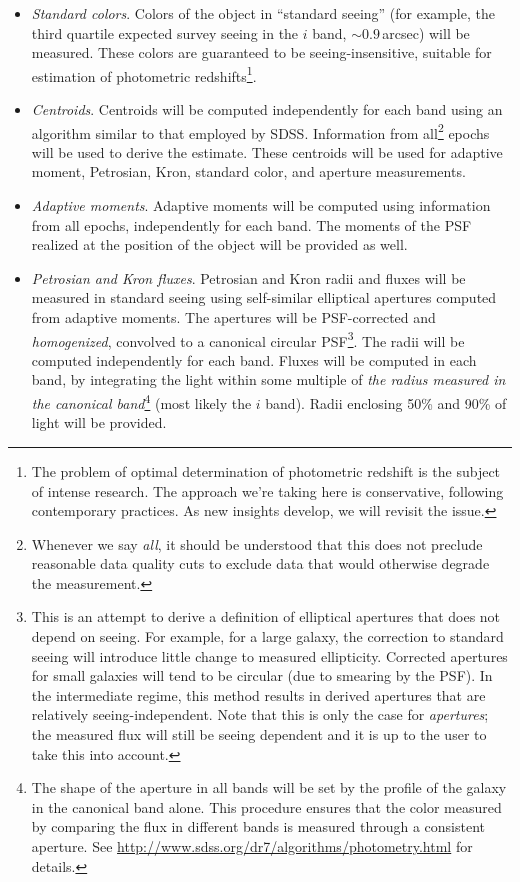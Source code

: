 \documentclass[SE,lsstdraft,toc]{lsstdoc}
\newcommand{\marginreq}[1]{\marginpar{\hspace{0pt}\tiny #1}}
\newcommand{\dmreq}[1]{\marginreq{DMS-REQ-#1}}
\begin{document}
\begin{itemize}
    \item \emph{Standard colors}. \dmreq{0276} Colors of the object in ``standard seeing'' (for example, the third quartile expected survey seeing in the $i$ band, $\sim 0.9$\,arcsec) will be measured. These colors are guaranteed to be seeing-insensitive,  suitable for estimation of photometric redshifts\footnote{The problem of optimal determination of photometric redshift is the subject of intense research. The approach we're taking here is conservative, following contemporary practices. As new insights develop, we will revisit the issue.}.

    \item \emph{Centroids}. Centroids will be computed independently for each band using an algorithm similar to that employed by SDSS. Information from all\footnote{Whenever we say \emph{all}, it should be understood that this does not preclude reasonable data quality cuts to exclude data that would otherwise degrade the measurement.} epochs will be used to derive the estimate. These centroids will be used for adaptive moment, Petrosian, Kron, standard color, and aperture measurements. \dmreq{0276}

    \item \emph{Adaptive moments}. Adaptive moments will be computed using information from all epochs, independently for each band. The moments of the PSF realized at the position of the object will be provided as well. \dmreq{0276}

    \item \emph{Petrosian and Kron fluxes}. Petrosian and Kron radii and fluxes will be measured in standard seeing using self-similar elliptical apertures computed from adaptive moments. The apertures will be PSF-corrected and \emph{homogenized}, convolved to a canonical circular PSF\footnote{This is an attempt to derive a definition of elliptical apertures that does not depend on seeing. For example, for a large galaxy, the correction to standard seeing will introduce little change to measured ellipticity. Corrected apertures for small galaxies will tend to be circular (due to smearing by the PSF). In the intermediate regime, this method results in derived apertures that are relatively seeing-independent. Note that this is only the case for \emph{apertures}; the measured flux will still be seeing dependent and it is up to the user to take this into account.}. The radii will be computed independently for each band. Fluxes will be computed in each band, by integrating the light within some multiple of \emph{the radius measured in the canonical band}\footnote{The shape of the aperture in all bands will be set by the profile of the galaxy in the canonical band alone. This procedure ensures that the color measured by comparing the flux in different bands is measured through a consistent aperture. See \url{http://www.sdss.org/dr7/algorithms/photometry.html} for details.} (most likely the $i$ band). Radii enclosing 50\% and 90\% of light will be provided. \dmreq{0276}


\end{itemize}
\end{document}
